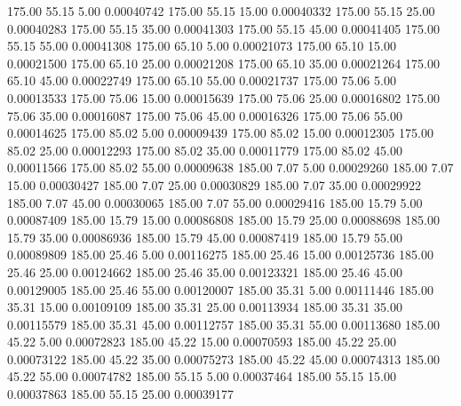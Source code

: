     175.00     55.15      5.00     0.00040742
    175.00     55.15     15.00     0.00040332
    175.00     55.15     25.00     0.00040283
    175.00     55.15     35.00     0.00041303
    175.00     55.15     45.00     0.00041405
    175.00     55.15     55.00     0.00041308
    175.00     65.10      5.00     0.00021073
    175.00     65.10     15.00     0.00021500
    175.00     65.10     25.00     0.00021208
    175.00     65.10     35.00     0.00021264
    175.00     65.10     45.00     0.00022749
    175.00     65.10     55.00     0.00021737
    175.00     75.06      5.00     0.00013533
    175.00     75.06     15.00     0.00015639
    175.00     75.06     25.00     0.00016802
    175.00     75.06     35.00     0.00016087
    175.00     75.06     45.00     0.00016326
    175.00     75.06     55.00     0.00014625
    175.00     85.02      5.00     0.00009439
    175.00     85.02     15.00     0.00012305
    175.00     85.02     25.00     0.00012293
    175.00     85.02     35.00     0.00011779
    175.00     85.02     45.00     0.00011566
    175.00     85.02     55.00     0.00009638
    185.00      7.07      5.00     0.00029260
    185.00      7.07     15.00     0.00030427
    185.00      7.07     25.00     0.00030829
    185.00      7.07     35.00     0.00029922
    185.00      7.07     45.00     0.00030065
    185.00      7.07     55.00     0.00029416
    185.00     15.79      5.00     0.00087409
    185.00     15.79     15.00     0.00086808
    185.00     15.79     25.00     0.00088698
    185.00     15.79     35.00     0.00086936
    185.00     15.79     45.00     0.00087419
    185.00     15.79     55.00     0.00089809
    185.00     25.46      5.00     0.00116275
    185.00     25.46     15.00     0.00125736
    185.00     25.46     25.00     0.00124662
    185.00     25.46     35.00     0.00123321
    185.00     25.46     45.00     0.00129005
    185.00     25.46     55.00     0.00120007
    185.00     35.31      5.00     0.00111446
    185.00     35.31     15.00     0.00109109
    185.00     35.31     25.00     0.00113934
    185.00     35.31     35.00     0.00115579
    185.00     35.31     45.00     0.00112757
    185.00     35.31     55.00     0.00113680
    185.00     45.22      5.00     0.00072823
    185.00     45.22     15.00     0.00070593
    185.00     45.22     25.00     0.00073122
    185.00     45.22     35.00     0.00075273
    185.00     45.22     45.00     0.00074313
    185.00     45.22     55.00     0.00074782
    185.00     55.15      5.00     0.00037464
    185.00     55.15     15.00     0.00037863
    185.00     55.15     25.00     0.00039177

